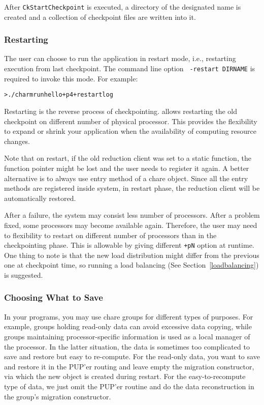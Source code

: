 After {\tt CkStartCheckpoint} is executed, a directory of the designated
name is created and a collection of checkpoint files are written into it. 

\subsubsection{Restarting}

The user can choose to run the \charmpp{} application in restart mode, i.e.,
restarting execution from last checkpoint. The command line option {\tt
-restart DIRNAME} is required to invoke this mode. For example:

\begin{alltt}
  > ./charmrun hello +p4 +restart log
\end{alltt}

Restarting is the reverse process of checkpointing. \charmpp{} allows 
restarting the old checkpoint on different number of physical processor.
This provides the flexibility to expand or shrink your application when
the availability of computing resource changes. 

Note that on restart, if the old reduction client was set to a static 
function, the function pointer might be lost and the user needs to register
it again. A better alternative is to always use entry method of a chare
object. Since all the entry methods are registered inside \charmpp{} system,
in restart phase, the reduction client will be automatically restored.

After a failure, the system may consist less number of processors. After
a problem fixed, some processors may become available again. Therefore,
the user may need to flexibility to restart on different number of processors
than in the checkpointing phase. This is allowable by giving different 
{\tt +pN} option at runtime. One thing to note is that the new load 
distribution might differ from the previous one at checkpoint time,
so running a load balancing (See Section~\ref{loadbalancing}) is suggested. 

\subsubsection{Choosing What to Save}
In your programs, you may use chare groups for different types of purposes. 
For example, groups holding read-only data can avoid excessive data copying,
while groups maintaining processor-specific information is used as a local
manager of the processor. In the latter situation, the data is sometimes
too complicated to save and restore but easy to re-compute. For the read-only
data, you want to save and restore it in the PUP'er routing and leave empty
the migration constructor, via which the new object is created during restart.
For the easy-to-recompute type of data, we just omit the PUP'er routine and
do the data reconstruction in the group's migration constructor.

